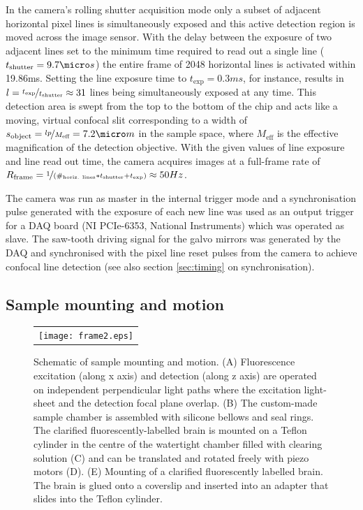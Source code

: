 \documentclass[12pt]{spieman}  %
\begin{document}
\begin{spacing}{2}
In the camera's rolling shutter acquisition mode only a subset of adjacent horizontal pixel lines is simultaneously exposed and this active detection region is moved across the image sensor\cite{Baumgart2012}. With the delay between the exposure of two adjacent lines set to the minimum time required to read out a single line ($t_{\text{shutter}}=9.7\micro s$) the entire frame of 2048 horizontal lines is activated within 19.86ms. Setting the line exposure time to $t_{\text{exp}}=0.3ms$, for instance, results in $l=\nicefrac{t_{\text{exp}}}{t_{\text{shutter}}}\approx31$  lines being simultaneously exposed at any time. This detection area is swept from the top to the bottom of the chip and acts like a moving, virtual confocal slit corresponding to a width of $s_{\text{object}}=\nicefrac{l p}{M_{\text{eff}}}= 7.2 \micro m $ in the sample space, where $M_{\text{eff}}$ is the effective magnification of the detection objective. With the given values of line exposure and line read out time, the camera acquires images at a full-frame rate of  $R_{\text{frame}} = \nicefrac{1}{(\#_{\text{horiz. lines}}*t_{\text{shutter}}+t_{\text{exp}})} \approx 50Hz$. 

The camera was run as master in the internal trigger mode and a synchronisation pulse generated with the exposure of each new line was used as an output trigger for a DAQ board (NI PCIe-6353, National Instruments) which was operated as slave. The saw-tooth driving signal for the galvo mirrors was generated by the DAQ and synchronised with the pixel line reset pulses from the camera to achieve confocal line detection (see also section \ref{sec:timing} on synchronisation).  

\subsection{Sample mounting and motion}
\label{sec:mounting}
		
\begin{figure}
   \begin{center}
   \begin{tabular}{c}
   \texttt{[image: frame2.eps]}
   \end{tabular}
   \end{center}
   \caption{\label{fig:frame2} Schematic of sample mounting and motion. (A) Fluorescence excitation (along x axis) and detection (along z axis) are operated on independent perpendicular light paths where the excitation light-sheet and the detection focal plane overlap. (B) The custom-made sample chamber is assembled with silicone bellows and seal rings. The clarified fluorescently-labelled brain is mounted on a Teflon cylinder in the centre of the watertight chamber filled with clearing solution (C) and can be translated and rotated freely with piezo motors (D). (E) Mounting of a clarified fluorescently labelled brain. The brain is glued onto a coverslip and inserted into an adapter that slides into the Teflon cylinder.} 
   \end{figure}		


\end{spacing}
\end{document}

